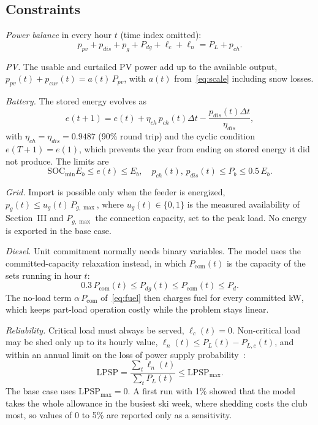 \subsection{Constraints}
\emph{Power balance} in every hour $t$ (time index omitted):
\begin{equation}
p_{pv} + p_{dis} + p_g + P_{dg} + \ell_c + \ell_n = P_L + p_{ch}.
\label{eq:balance}
\end{equation}

\emph{PV.} The usable and curtailed PV power add up to the available output,
$p_{pv}(t) + p_{cur}(t) = a(t)\,P_{pv}$, with $a(t)$ from~\eqref{eq:scale} including snow losses.

\emph{Battery.} The stored energy evolves as
\begin{equation}
e(t+1) = e(t) + \eta_{ch}\,p_{ch}(t)\Delta t - \frac{p_{dis}(t)\Delta t}{\eta_{dis}},
\label{eq:soc}
\end{equation}
with $\eta_{ch}=\eta_{dis}=0.9487$ (90\% round trip) and the cyclic condition $e(T+1)=e(1)$, which prevents the year from
ending on stored energy it did not produce. The limits are
\begin{equation}
\mathrm{SOC}_{\min}E_b \le e(t) \le E_b, \quad p_{ch}(t),\,p_{dis}(t) \le P_b \le 0.5\,E_b.
\label{eq:batlim}
\end{equation}

\emph{Grid.} Import is possible only when the feeder is energized, $p_g(t) \le u_g(t)\,P_{g,\max}$,
where $u_g(t)\in\{0,1\}$ is the measured availability of Section~III and $P_{g,\max}$ the connection
capacity, set to the peak load. No energy is exported in the base case.

\emph{Diesel.} Unit commitment normally needs binary variables. The model uses the committed-capacity
relaxation instead, in which $P_{\mathrm{com}}(t)$ is the capacity of the sets running in hour $t$:
\begin{equation}
0.3\,P_{\mathrm{com}}(t) \le P_{dg}(t) \le P_{\mathrm{com}}(t) \le P_d.
\label{eq:diesel}
\end{equation}
The no-load term $\alpha\,P_{\mathrm{com}}$ of~\eqref{eq:fuel} then charges fuel for every committed kW,
which keeps part-load operation costly while the problem stays linear.

\emph{Reliability.} Critical load must always be served, $\ell_c(t)=0$. Non-critical load may be shed
only up to its hourly value, $\ell_n(t) \le P_L(t) - P_{L,c}(t)$, and within an annual
limit on the loss of power supply probability~\cite{yang2008}:
\begin{equation}
\mathrm{LPSP} = \frac{\sum_t \ell_n(t)}{\sum_t P_L(t)} \le \mathrm{LPSP}_{\max}.
\label{eq:lpsp}
\end{equation}
The base case uses $\mathrm{LPSP}_{\max}=0$. A first run with 1\% showed that the model takes the
whole allowance in the busiest ski week, where shedding costs the club most, so values of 0 to 5\%
are reported only as a sensitivity.

